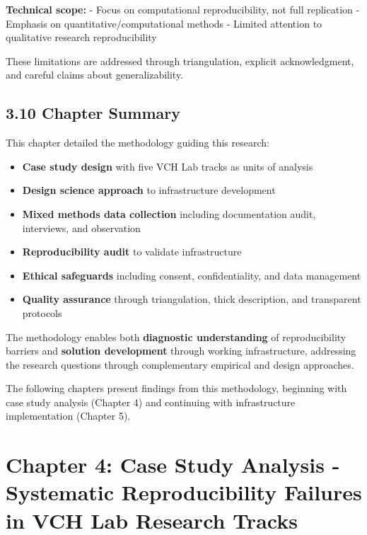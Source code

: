 \documentclass[
  oneside,
  open=any]{scrbook}
\providecommand{\tightlist}{%
  \setlength{\itemsep}{0pt}\setlength{\parskip}{0pt}}\usepackage{longtable,booktabs,array}
\begin{document}
\textbf{Technical scope:} - Focus on computational reproducibility, not
full replication - Emphasis on quantitative/computational methods -
Limited attention to qualitative research reproducibility

These limitations are addressed through triangulation, explicit
acknowledgment, and careful claims about generalizability.

\section{3.10 Chapter Summary}\label{chapter-summary-1}

This chapter detailed the methodology guiding this research:

\begin{itemize}
\tightlist
\item
  \textbf{Case study design} with five VCH Lab tracks as units of
  analysis
\item
  \textbf{Design science approach} to infrastructure development
\item
  \textbf{Mixed methods data collection} including documentation audit,
  interviews, and observation
\item
  \textbf{Reproducibility audit} to validate infrastructure
\item
  \textbf{Ethical safeguards} including consent, confidentiality, and
  data management
\item
  \textbf{Quality assurance} through triangulation, thick description,
  and transparent protocols
\end{itemize}

The methodology enables both \textbf{diagnostic understanding} of
reproducibility barriers and \textbf{solution development} through
working infrastructure, addressing the research questions through
complementary empirical and design approaches.

The following chapters present findings from this methodology, beginning
with case study analysis (Chapter 4) and continuing with infrastructure
implementation (Chapter 5).

\chapter{Chapter 4: Case Study Analysis - Systematic Reproducibility
Failures in VCH Lab Research
Tracks}\label{chapter-4-case-study-analysis---systematic-reproducibility-failures-in-vch-lab-research-tracks}
\end{document}
